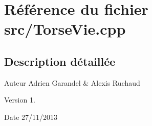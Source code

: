 \section{Référence du fichier src/\-Torse\-Vie.cpp}
\label{_torse_vie_8cpp}


\subsection{Description détaillée}
\begin{DoxyAuthor}{Auteur}
Adrien Garandel \& Alexis Ruchaud 
\end{DoxyAuthor}
\begin{DoxyVersion}{Version}
1. 
\end{DoxyVersion}
\begin{DoxyDate}{Date}
27/11/2013 
\end{DoxyDate}
